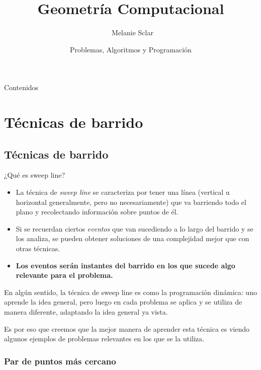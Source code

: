 \documentclass[compress]{beamer}
\title[Geometr\'ia Computacional] %
{Geometr\'ia Computacional}
\author[Melanie Sclar] %
{~Melanie Sclar}
\institute[UBA] %
{
  Facultad de Ciencias Exactas y Naturales\\
  Universidad de Buenos Aires
}
\date[PAP] %
{Problemas, Algoritmos y Programación}
\begin{document}
\begin{frame}
  \titlepage
\end{frame}

\begin{frame}{Contenidos}
  \tableofcontents
\end{frame}

\section{T\'ecnicas de barrido}

\subsection{T\'ecnicas de barrido}
\begin{frame}{¿Qu\'e es sweep line?}
\begin{itemize}
\item La t\'ecnica de \emph{sweep line} se caracteriza por tener una l\'inea (vertical u horizontal generalmente, pero no necesariamente) que va barriendo todo el plano y recolectando informaci\'on sobre puntos de \'el.

\bigskip 
%
\item Si se recuerdan ciertos {\it eventos} que van sucediendo a lo largo del barrido y se los analiza, se pueden obtener soluciones de una complejidad mejor que con otras t\'ecnicas.
\bigskip
\item \textbf{Los eventos ser\'an instantes del barrido en los que sucede algo relevante para el problema.}
\end{itemize}
\end{frame}

\begin{frame}
En alg\'un sentido, la t\'ecnica de sweep line es como la programaci\'on din\'amica: uno aprende la idea general, pero luego en cada problema se aplica y se utiliza de manera diferente, adaptando la idea general ya vista.
\bigskip

Es por eso que creemos que la mejor manera de aprender esta t\'ecnica es viendo algunos ejemplos de problemas relevantes en los que se la utiliza.
\end{frame}

\subsubsection{Par de puntos m\'as cercano}
\end{document}
